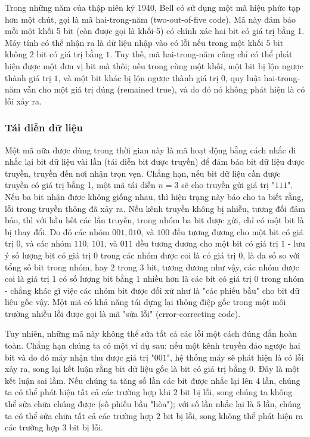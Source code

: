 \documentclass[14pt]{extreport}
\begin{document}
Trong những năm của thập niên kỷ 1940, Bell có sử dụng một mã hiệu phức tạp hơn một chút, gọi là mã hai-trong-năm (two-out-of-five code). Mã này đảm bảo mỗi một khối 5 bit (còn được gọi là khối-5) có chính xác hai bit có giá trị bằng 1. Máy tính có thể nhận ra là dữ liệu nhập vào có lỗi nếu trong một khối $5$ bit không $2$ bit có giá trị bằng $1$. Tuy thế, mã hai-trong-năm cũng chỉ có thể phát hiện được một đơn vị bit mà thôi; nếu trong cùng một khối, một bit bị lộn ngược thành giá trị $1$, và một bit khác bị lộn ngược thành giá trị $0$, quy luật hai-trong-năm vẫn cho một giá trị đúng (remained true), và do đó nó không phát hiện là có lỗi xảy ra.
\subsubsection{Tái diễn dữ liệu}



Một mã nữa được dùng trong thời gian này là mã hoạt động bằng cách nhắc đi nhắc lại bit dữ liệu vài lần (tái diễn bit được truyền) để đảm bảo bit dữ liệu được truyền, truyền đến nơi nhận trọn vẹn. Chẳng hạn, nếu bit dữ liệu cần được truyền có giá trị bằng 1, một mã tái diễn $n=3$ sẽ cho truyền gửi giá trị "$111$". Nếu ba bit nhận được không giống nhau, thì hiện trạng này báo cho ta biết rằng, lỗi trong truyền thông đã xảy ra. Nếu kênh truyền không bị nhiễu, tương đối đảm bảo, thì với hầu hết các lần truyền, trong nhóm ba bit được gửi, chỉ có một bit là bị thay đổi. Do đó các nhóm $001, 010$, và $100$ đều tương đương cho một bit có giá trị $0$, và các nhóm $110$, $101$, và $011$ đều tương đương cho một bit có giá trị $1$ - lưu ý số lượng bit có giá trị $0$ trong các nhóm được coi là có giá trị $0$, là đa số so với tổng số bit trong nhóm, hay $2$ trong $3$ bit, tương đương như vậy, các nhóm được coi là giá trị $1$ có số lượng bit bằng $1$ nhiều hơn là các bit có giá trị $0$ trong nhóm - chẳng khác gì việc các nhóm bit được đối xử như là "các phiếu bầu" cho bit dữ liệu gốc vậy. Một mã có khả năng tái dựng lại thông điệp gốc trong một môi trường nhiễu lỗi được gọi là mã "sửa lỗi" (error-correcting code).

Tuy nhiên, những mã này không thể sửa tất cả các lỗi một cách đúng đắn hoàn toàn. Chẳng hạn chúng ta có một ví dụ sau: nếu một kênh truyền đảo ngược hai bit và do đó máy nhận thu được giá trị "$001$", hệ thống máy sẽ phát hiện là có lỗi xảy ra, song lại kết luận rằng bit dữ liệu gốc là bit có giá trị bằng $0$. Đây là một kết luận sai lầm. Nếu chúng ta tăng số lần các bit được nhắc lại lên $4$ lần, chúng ta có thể phát hiện tất cả các trường hợp khi $2$ bit bị lỗi, song chúng ta không thể sửa chữa chúng được (số phiếu bầu "hòa"); với số lần nhắc lại là $5$ lần, chúng ta có thể sửa chữa tất cả các trường hợp $2$ bit bị lỗi, song không thể phát hiện ra các trường hợp $3$ bit bị lỗi.
\end{document}
